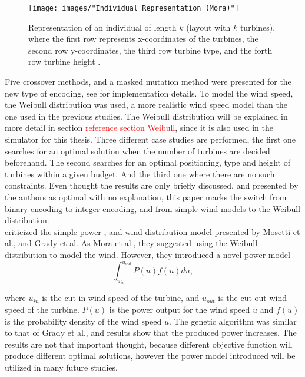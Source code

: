 \begin{figure}[h!]
\begin{center}
\texttt{[image: images/"Individual Representation (Mora)"]}
\caption{Representation of an individual of length $k$ (layout with $k$ turbines), where the first row represents x-coordinates of the turbines, the second row y-coordinates, the third row turbine type, and the forth row turbine height \citep{Mora}.}
\label{Individual Representation (Mora)}
\end{center}
\end{figure}


\noindent Five crossover methods, and a masked mutation method were presented for the new type of encoding, see \cite{Mora} for implementation details. To model the wind speed, the Weibull distribution was used, a more realistic wind speed model than the one used in the previous studies. The Weibull distribution will be explained in more detail in section \textcolor{red}{reference section Weibull}, since it is also used in the simulator for this thesis. Three different case studies are performed, the first one searches for an optimal solution when the number of turbines are decided beforehand. The second searches for an optimal positioning, type and height of turbines within a given budget. And the third one where there are no such constraints. Even thought the results are only briefly discussed, and presented by the authors as optimal with no explanation, this paper marks the switch from binary encoding to integer encoding, and from simple wind models to the Weibull distribution.\\


\noindent \cite{Wan} criticized the simple power-, and wind distribution model presented by Mosetti et al., and Grady et al. As Mora et al., they suggested using the Weibull distribution to model the wind. However, they introduced a novel power model \\


\begin{equation}
\label{Power Model (Wan)}
\int_{u_{in}}^{u_{out}} P(u)f(u) du,
\end{equation}


\noindent where $u_{in}$ is the cut-in wind speed of the turbine, and $u_{out}$ is the cut-out wind speed of the turbine. $P(u)$ is the power output for the wind speed $u$ and $f(u)$ is the probability density of the wind speed $u$. The genetic algorithm was similar to that of Grady et al., and results show that the produced power increases. The results are not that important thought, because different objective function will produce different optimal solutions, however the power model introduced will be utilized in many future studies.\\


